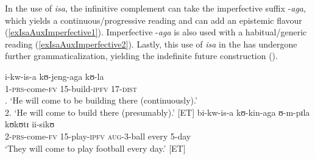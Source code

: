 In the  use of \textit{isa}, the infinitive complement can take the imperfective suffix \mbox{-\textit{aga}}, which yields a continuous/progressive reading and can add an epistemic flavour (\ref{exIsaAuxImperfective1}). Imperfective \mbox{-\textit{aga}} is also used with a habitual/generic reading (\ref{exIsaAuxImperfective2}). Lastly, this  use of \textit{isa} in the  has undergone further grammaticalization, yielding the indefinite future construction ().

\begin{exe}
\ex \label{exIsaAuxImperfective1}
\gll i-kw-is-a kʊ-jeng-aga kʊ-la\\
1-\textsc{prs}-come-\textsc{fv} 15-build-\textsc{ipfv} 17-\textsc{dist}\\
. \lq He will come to be building there (continuously).'\\
2. \lq He will come to build there (presumably).' [ET]
\ex \label{exIsaAuxImperfective2}
\gll bi-kw-is-a kʊ-kin-aga ʊ-m-pɪla kʊkʊtɪ ii-sikʊ\\
2-\textsc{prs}-come-\textsc{fv} 15-play-\textsc{ipfv} \textsc{aug}-3-ball every 5-day\\
\glt \lq They will come to play football every day.' [ET]
\end{exe}
